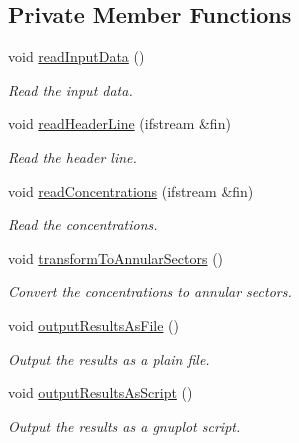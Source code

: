\subsection*{Private Member Functions}
\begin{DoxyCompactItemize}
\item 
void \hyperlink{classmultiscale_1_1video_1_1CartesianToPolarConverter_a37891007ade23e05047d33d0c9cb3e13}{read\-Input\-Data} ()
\begin{DoxyCompactList}\small\item\em Read the input data. \end{DoxyCompactList}\item 
void \hyperlink{classmultiscale_1_1video_1_1CartesianToPolarConverter_a88d7c95fb76c9e139cb013c11a8dfae0}{read\-Header\-Line} (ifstream \&fin)
\begin{DoxyCompactList}\small\item\em Read the header line. \end{DoxyCompactList}\item 
void \hyperlink{classmultiscale_1_1video_1_1CartesianToPolarConverter_a7335cccc7e3c14203b00357ec6a2c140}{read\-Concentrations} (ifstream \&fin)
\begin{DoxyCompactList}\small\item\em Read the concentrations. \end{DoxyCompactList}\item 
void \hyperlink{classmultiscale_1_1video_1_1CartesianToPolarConverter_a0c3f499725a058d2a3251209d8c16178}{transform\-To\-Annular\-Sectors} ()
\begin{DoxyCompactList}\small\item\em Convert the concentrations to annular sectors. \end{DoxyCompactList}\item 
void \hyperlink{classmultiscale_1_1video_1_1CartesianToPolarConverter_adb3aeeb5f2994f8aa9dc03c8c8f270ad}{output\-Results\-As\-File} ()
\begin{DoxyCompactList}\small\item\em Output the results as a plain file. \end{DoxyCompactList}\item 
void \hyperlink{classmultiscale_1_1video_1_1CartesianToPolarConverter_a680e357efb54b1193715259cb339516e}{output\-Results\-As\-Script} ()
\begin{DoxyCompactList}\small\item\em Output the results as a gnuplot script. \end{DoxyCompactList}\end{DoxyCompactItemize}
